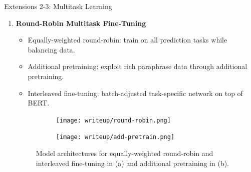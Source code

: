 \documentclass[final]{beamer}
\newlength{\colwidth}
\begin{document}
\begin{frame}[t]
\begin{columns}[t]
\begin{column}{\colwidth}
\begin{block}{Extensions 2-3: Multitask Learning}
    \begin{enumerate}%
      \item \textbf{Round-Robin Multitask Fine-Tuning}
      \begin{itemize}
      \normalsize
          \item Equally-weighted round-robin: train on all prediction tasks while balancing data.
          \item Additional pretraining: exploit rich paraphrase data through additional pretraining.
          \item Interleaved fine-tuning: batch-adjusted task-specific network on top of BERT.
          \vspace{-0.3cm}
      \end{itemize}
          \begin{figure}[H]
     \centering
     \begin{subfigure}[b]{0.485\textwidth}
         \centering
        \texttt{[image: writeup/round-robin.png]}
         \caption{}
     \end{subfigure}
     \begin{subfigure}[b]{0.485\textwidth}
        \centering
        \texttt{[image: writeup/add-pretrain.png]}
         \caption{}
     \end{subfigure}
\caption{Model architectures for equally-weighted round-robin and interleaved fine-tuning in (a) and additional pretraining in (b).} %
\label{fig:birds}
\end{figure} 
      

\end{enumerate}
\end{block}
\end{column}
\end{columns}
\end{frame}
\end{document}
